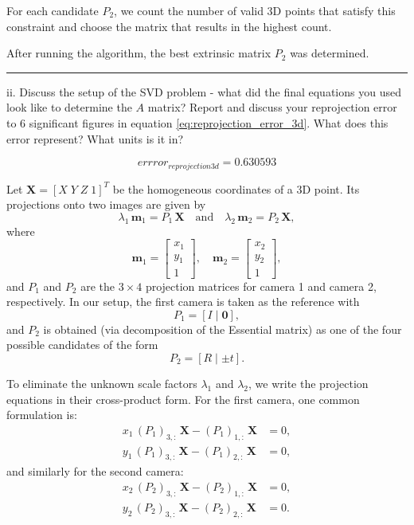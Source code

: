 \documentclass[onecolumn,10pt]{article}
\begin{document}
For each candidate \(P_2\), we count the number of valid 3D points that satisfy this constraint and choose the matrix that results in the highest count.

After running the algorithm, the best extrinsic matrix \(P_2\) was determined.

\hrule

ii. Discuss the setup of the SVD problem - what did the final equations you used look like to determine the $A$ matrix? Report and discuss your reprojection error to 6 significant figures in equation \ref{eq:reprojection_error_3d}. What does this error represent? What units is it in?

\begin{equation}
errror_{reprojection3d}=0.630593 \label{eq:reprojection_error_3d}
\end{equation}

Let \(\mathbf{X} = [X \; Y \; Z \; 1]^T\) be the homogeneous coordinates of a 3D point. Its projections onto two images are given by
\[
\lambda_1\,\mathbf{m}_1 = P_1\,\mathbf{X} \quad \text{and} \quad \lambda_2\,\mathbf{m}_2 = P_2\,\mathbf{X},
\]
where
\[
\mathbf{m}_1 = \begin{bmatrix} x_1 \\ y_1 \\ 1 \end{bmatrix}, \quad
\mathbf{m}_2 = \begin{bmatrix} x_2 \\ y_2 \\ 1 \end{bmatrix},
\]
and \(P_1\) and \(P_2\) are the \(3\times4\) projection matrices for camera 1 and camera 2, respectively. In our setup, the first camera is taken as the reference with
\[
P_1 = [I \mid \mathbf{0}],
\]
and \(P_2\) is obtained (via decomposition of the Essential matrix) as one of the four possible candidates of the form
\[
P_2 = [R \mid \pm t].
\]

To eliminate the unknown scale factors \(\lambda_1\) and \(\lambda_2\), we write the projection equations in their cross-product form. For the first camera, one common formulation is:
\[
\begin{aligned}
x_1\,(P_1)_{3,:}\,\mathbf{X} - (P_1)_{1,:}\,\mathbf{X} &= 0,\\[1mm]
y_1\,(P_1)_{3,:}\,\mathbf{X} - (P_1)_{2,:}\,\mathbf{X} &= 0,
\end{aligned}
\]
and similarly for the second camera:
\[
\begin{aligned}
x_2\,(P_2)_{3,:}\,\mathbf{X} - (P_2)_{1,:}\,\mathbf{X} &= 0,\\[1mm]
y_2\,(P_2)_{3,:}\,\mathbf{X} - (P_2)_{2,:}\,\mathbf{X} &= 0.
\end{aligned}
\]
\end{document}
